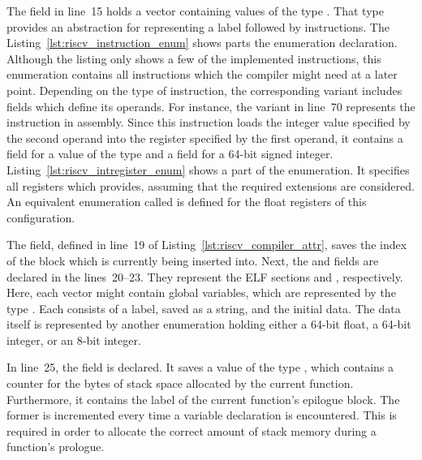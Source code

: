 
The  field in line~15 holds a vector containing values of the type .
That type provides an abstraction for representing a label followed by instructions.
The Listing~\ref{lst:riscv_instruction_enum} shows parts the  enumeration declaration.
Although the listing only shows a few of the implemented instructions,
this enumeration contains all instructions which the compiler might need at a later point.
Depending on the type of instruction, the corresponding variant includes fields which define its operands.
For instance, the  variant in line~70 represents the  instruction in assembly.
Since this instruction loads the integer value specified by the second operand into the register specified by the first operand,
it contains a field for a value of the type  and a field for a 64-bit signed integer.
Listing~\ref{lst:riscv_intregister_enum} shows a part of the  enumeration.
It specifies all registers which \riscv{} provides, assuming that the required extensions are considered.
An equivalent enumeration called  is defined for the float registers of this \riscv{} configuration.


The  field, defined in line~19 of Listing~\ref{lst:riscv_compiler_attr},
saves the index of the block which is currently being inserted into.
Next, the  and  fields are declared in the lines~20--23.
They represent the ELF sections  and , respectively.
Here, each vector might contain global variables, which are represented by the type .
Each  consists of a label, saved as a string, and the initial data.
The data itself is represented by another enumeration holding either a 64-bit float, a 64-bit integer, or an 8-bit integer.

In line~25, the  field is declared.
It saves a value of the type , which contains a counter for the bytes of stack space allocated by the current function.
Furthermore, it contains the label of the current function's epilogue block.
The former is incremented every time a variable declaration is encountered.
This is required in order to allocate the correct amount of stack memory during a function's prologue.

